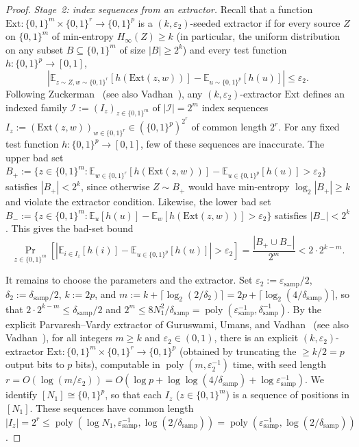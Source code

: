 \documentclass[11pt]{article}
\theoremstyle{definition}
\newcommand{\E}{\mathbb{E}}
\newcommand{\poly}{\operatorname{poly}}
\newcommand{\abs}[1]{\left\lvert #1 \right\rvert}
\begin{document}
\begin{proof}
\emph{Stage~2: index sequences from an extractor.} Recall that a function $\mathrm{Ext} : \{0, 1\}^m \times \{0, 1\}^r \to \{0, 1\}^p$ is a $(k, \varepsilon_2)$-seeded extractor if for every source $Z$ on $\{0, 1\}^m$ of min-entropy $H_\infty(Z) \ge k$ (in particular, the uniform distribution on any subset $B \subseteq \{0, 1\}^m$ of size $\abs{B} \ge 2^k$) and every test function $h : \{0, 1\}^p \to [0, 1]$,
\[
    \abs{\E_{z \sim Z, w \sim \{0, 1\}^r}[h(\mathrm{Ext}(z, w))] - \E_{u \sim \{0, 1\}^p}[h(u)]} \le \varepsilon_2.
\]
Following Zuckerman~\cite[Lemma~2.6 \& Proposition~2.7]{Zuckerman97} (see also Vadhan~\cite[Corollary~6.24]{Vadhan12}), any $(k, \varepsilon_2)$-extractor $\mathrm{Ext}$ defines an indexed family $\mathcal{I} := (I_z)_{z \in \{0, 1\}^m}$ of $\abs{\mathcal{I}} = 2^m$ index sequences $I_z := (\mathrm{Ext}(z, w))_{w \in \{0, 1\}^r} \in (\{0, 1\}^p)^{2^r}$ of common length $2^r$. For any fixed test function $h : \{0, 1\}^p \to [0, 1]$, few of these sequences are inaccurate. The upper bad set $B_+ := \{z \in \{0, 1\}^m : \E_{w \in \{0, 1\}^r}[h(\mathrm{Ext}(z, w))] - \E_{u \in \{0, 1\}^p}[h(u)] > \varepsilon_2\}$ satisfies $\abs{B_+} < 2^k$, since otherwise $Z \sim B_+$ would have min-entropy $\log_2\abs{B_+} \ge k$ and violate the extractor condition. Likewise, the lower bad set $B_- := \{z \in \{0, 1\}^m : \E_u[h(u)] - \E_w[h(\mathrm{Ext}(z, w))] > \varepsilon_2\}$ satisfies $\abs{B_-} < 2^k$. This gives the bad-set bound
\[
    \Pr_{z \in \{0, 1\}^m}\!\left[\abs{\E_{i \in I_z}[h(i)] - \E_{u \in \{0, 1\}^p}[h(u)]} > \varepsilon_2\right] = \frac{\abs{B_+ \cup B_-}}{2^m} < 2 \cdot 2^{k - m}.
\]

It remains to choose the parameters and the extractor. Set $\varepsilon_2 := \varepsilon_{\text{samp}}/2$, $\delta_2 := \delta_{\text{samp}}/2$, $k := 2p$, and $m := k + \lceil \log_2(2/\delta_2) \rceil = 2p + \lceil \log_2(4/\delta_{\text{samp}}) \rceil$, so that $2 \cdot 2^{k - m} \le \delta_{\text{samp}}/2$ and $2^m \le 8 N_1^2 / \delta_{\text{samp}} = \poly(\varepsilon_{\text{samp}}^{-1}, \delta_{\text{samp}}^{-1})$. By the explicit Parvaresh--Vardy extractor of Guruswami, Umans, and Vadhan~\cite[Theorem~1.5 \& Theorem~5.12]{GUV09} (see also Vadhan~\cite[Theorem~6.36]{Vadhan12}), for all integers $m \ge k$ and $\varepsilon_2 \in (0, 1)$, there is an explicit $(k, \varepsilon_2)$-extractor $\mathrm{Ext} : \{0, 1\}^m \times \{0, 1\}^r \to \{0, 1\}^p$ (obtained by truncating the $\ge k/2 = p$ output bits to $p$ bits), computable in $\poly(m, \varepsilon_2^{-1})$ time, with seed length $r = O(\log(m/\varepsilon_2)) = O(\log p + \log\log(4/\delta_{\text{samp}}) + \log\varepsilon_{\text{samp}}^{-1})$. We identify $[N_1] \cong \{0, 1\}^p$, so that each $I_z$ ($z \in \{0, 1\}^m$) is a sequence of positions in $[N_1]$. These sequences have common length $\abs{I_z} = 2^r \le \poly(\log N_1, \varepsilon_{\text{samp}}^{-1}, \log(2/\delta_{\text{samp}})) = \poly(\varepsilon_{\text{samp}}^{-1}, \log(2/\delta_{\text{samp}}))$.


\end{proof}
\end{document}
